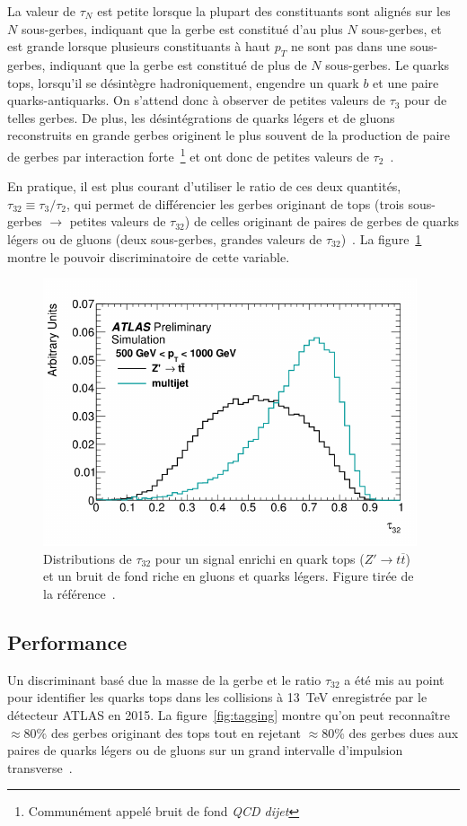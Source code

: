 La valeur de $\tau_N$ est petite lorsque la plupart des constituants
sont alignés sur les $N$ sous-gerbes, indiquant que la gerbe est
constitué d'au plus $N$ sous-gerbes, et est grande lorsque plusieurs
constituants à haut $p_T$ ne sont pas dans une sous-gerbes, indiquant
que la gerbe est constitué de plus de $N$ sous-gerbes. Le quarks tops,
lorsqu'il se désintègre hadroniquement, engendre un quark $b$ et une
paire quarks-antiquarks. On s'attend donc à observer de petites
valeurs de $\tau_3$ pour de telles gerbes. De plus, les
désintégrations de quarks légers et de gluons reconstruits en grande
gerbes originent le plus souvent de la production de paire de gerbes
par interaction forte~\footnote{Communément appelé bruit de fond
  \emph{QCD dijet}} et ont donc de petites valeurs de
$\tau_2$~\cite{thaler_identifying_2011}.

En pratique, il est plus courant d'utiliser le ratio de ces deux
quantités, $\tau_{32}\equiv\tau_3/\tau_2$, qui permet de différencier
les gerbes originant de tops (trois sous-gerbes $\rightarrow$ petites
valeurs de $\tau_{32}$) de celles originant de paires de gerbes de
quarks légers ou de gluons (deux sous-gerbes, grandes valeurs de
$\tau_{32}$)~\cite{_boosted_2015}. La figure~\ref{fig:nsubj} montre le
pouvoir discriminatoire de cette variable.

\begin{figure}
  \centering
  \includegraphics[width=.5\textwidth]{nsubj.pdf}
  \caption{Distributions de $\tau_{32}$ pour un signal enrichi en
    quark tops ($Z' \rightarrow t\overline{t}$) et un bruit de fond
    riche en gluons et quarks légers. Figure tirée de la
    référence~\cite{_boosted_2015}.}
  \label{fig:nsubj}
\end{figure}

\subsection{Performance}
\label{sec:top:sous_structure:perf}

Un discriminant basé due la masse de la gerbe et le ratio $\tau_{32}$
a été mis au point pour identifier les quarks tops dans les collisions
à 13~TeV enregistrée par le détecteur ATLAS en 2015. La
figure~\ref{fig:tagging} montre qu'on peut reconnaître $\approx 80\%$
des gerbes originant des tops tout en rejetant $\approx 80\%$ des
gerbes dues aux paires de quarks légers ou de gluons sur un grand
intervalle d'impulsion transverse~\cite{_boosted_2015}.

